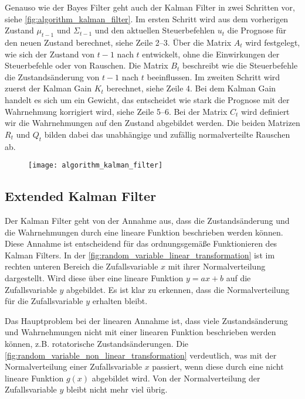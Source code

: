Genauso wie der Bayes Filter geht auch der Kalman Filter in zwei Schritten vor, siehe \autoref{fig:algorithm_kalman_filter}. Im ersten Schritt wird aus dem vorherigen Zustand $\mu_{t-1}$ und $\Sigma_{t-1}$ und den aktuellen Steuerbefehlen $u_t$ die Prognose für den neuen Zustand berechnet, siehe Zeile 2--3. Über die Matrix $A_t$ wird festgelegt, wie sich der Zustand von $t-1$ nach $t$ entwickelt, ohne die Einwirkungen der Steuerbefehle oder von Rauschen. Die Matrix $B_t$ beschreibt wie die Steuerbefehle die Zustandsänderung von $t-1$ nach $t$ beeinflussen. Im zweiten Schritt wird zuerst der Kalman Gain $K_t$ berechnet, siehe Zeile 4. Bei dem Kalman Gain handelt es sich um ein Gewicht, das entscheidet wie stark die Prognose mit der Wahrnehmung korrigiert wird, siehe Zeile 5--6. Bei der Matrix $C_t$ wird definiert wir die Wahrnehmungen auf den Zustand abgebildet werden. Die beiden Matrizen $R_t$ und $Q_t$ bilden dabei das unabhängige und zufällig normalverteilte Rauschen ab.

\begin{figure}
	\centering
	\texttt{[image: algorithm\_kalman\_filter]}
	\label{fig:algorithm_kalman_filter}
\end{figure}


%
%
%
\subsection{Extended Kalman Filter}

Der Kalman Filter geht von der Annahme aus, dass die Zustandsänderung und die Wahrnehmungen durch eine lineare Funktion beschrieben werden können. Diese Annahme ist entscheidend für das ordnungsgemäße Funktionieren des Kalman Filters. In der \autoref{fig:random_variable_linear_transformation} ist im rechten unteren Bereich die Zufallsvariable $x$ mit ihrer Normalverteilung dargestellt. Wird diese über eine lineare Funktion $y=ax+b$ auf die Zufallsvariable $y$ abgebildet. Es ist klar zu erkennen, dass die Normalverteilung für die Zufallsvariable $y$ erhalten bleibt.

Das Hauptproblem bei der linearen Annahme ist, dass viele Zustandsänderung und Wahrnehmungen nicht mit einer linearen Funktion beschrieben werden können, z.B. rotatorische Zustandsänderungen. Die \autoref{fig:random_variable_non_linear_transformation} verdeutlich, was mit der Normalverteilung einer Zufallsvariable $x$ passiert, wenn diese durch eine nicht lineare Funktion $g(x)$ abgebildet wird. Von der Normalverteilung der Zufallsvariable $y$ bleibt nicht mehr viel übrig.

